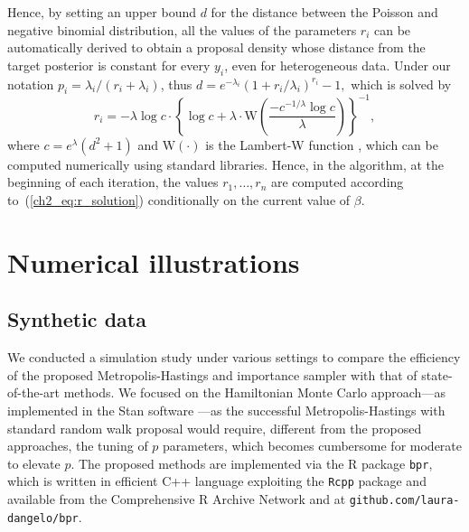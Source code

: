 Hence, by setting an upper bound $d$ for the distance between the Poisson and negative binomial distribution, all the values of the parameters $r_i$ can be automatically derived to obtain a proposal density whose distance from the target posterior is constant for every $y_i$, even for heterogeneous data. Under our notation $p_i=\lambda_i/(r_i+\lambda_i)$, thus
$d = e^{-\lambda_i} ( 1 + r_i/\lambda_i)^{r_i} - 1,$
which is solved by
\begin{equation}
r_i = - \lambda \log c \cdot
\left\{ \log c + \lambda \cdot\mathrm{W}\left( \frac{-c^{-1/\lambda} \log c}{\lambda} \right) \right\}^{-1},
\label{ch2_eq:r_solution}
\end{equation}
where $c=e^{\lambda}(d^2+1)$ and $\mathrm{W}(\cdot)$ is the Lambert-W function \parencite{W}, which can be computed numerically using standard libraries. 
%
Hence, in the algorithm, at the beginning of each iteration, the values $r_1, \dots, r_n$ are computed according to~(\ref{ch2_eq:r_solution}) conditionally on the current value of $\beta$. %


\section{Numerical illustrations}
\label{ch2_sec:illustr}

\subsection{Synthetic data}
\label{ch2_sec:sim}

We conducted a simulation study under various settings to compare the efficiency of the proposed Metropolis-Hastings and importance sampler with that of state-of-the-art methods. We focused on the Hamiltonian Monte Carlo approach---as implemented in the Stan software \parencite{stan}---as the successful Metropolis-Hastings with standard random walk proposal would require, different from the proposed approaches, the tuning of $p$ parameters, which becomes cumbersome for moderate to elevate $p$. The proposed methods are implemented via the R package \texttt{bpr}, %
which is written in efficient C++ language exploiting the \texttt{Rcpp} package \parencite{RCPP} and available from the Comprehensive R Archive Network \parencite{bpr} and at \texttt{github.com/laura-dangelo/bpr}.

